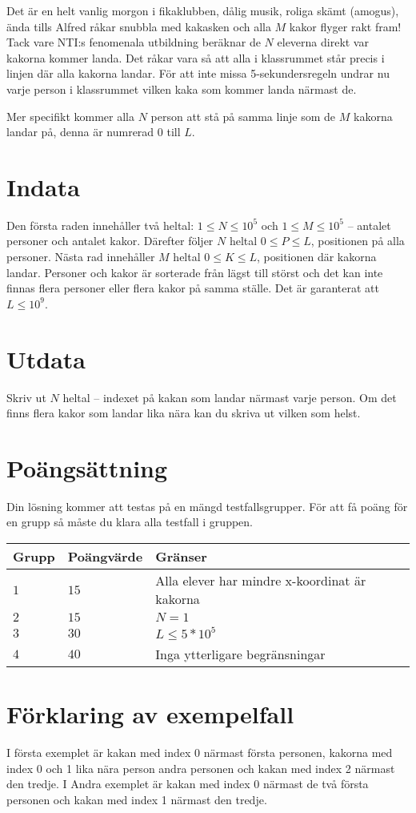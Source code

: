 Det är en helt vanlig morgon i fikaklubben, dålig musik, roliga skämt (amogus), ända tills Alfred råkar snubbla med kakasken och alla $M$ kakor flyger rakt fram!
Tack vare NTI:s fenomenala utbildning beräknar de $N$ eleverna direkt var kakorna kommer landa. Det råkar vara så att alla i klassrummet står precis i linjen där alla kakorna landar.
För att inte missa 5-sekundersregeln undrar nu varje person i klassrummet vilken kaka som kommer landa närmast de. 

Mer specifikt kommer alla $N$ person att stå på samma linje som de $M$ kakorna landar på, denna är numrerad 0 till $L$.


\section*{Indata}
Den första raden innehåller två heltal: $1\leq N \leq 10^5$ och $1 \leq M \leq 10^5$ -- antalet personer och antalet kakor. 
Därefter följer $N$ heltal $0 \leq P \leq L$, positionen på alla personer.
Nästa rad innehåller $M$ heltal $0 \leq K \leq L$, positionen där kakorna landar.
Personer och kakor är sorterade från lägst till störst och det kan inte finnas flera personer eller flera kakor på samma ställe.
Det är garanterat att $L \leq 10^9$.

\section*{Utdata}
Skriv ut $N$ heltal -- indexet på kakan som landar närmast varje person. Om det finns flera kakor som landar lika nära kan du skriva ut vilken som helst.

\section*{Poängsättning}
Din lösning kommer att testas på en mängd testfallsgrupper.
För att få poäng för en grupp så måste du klara alla testfall i gruppen.

\noindent
\begin{tabular}{| l | l | p{12cm} |}
  \hline
  Grupp & Poängvärde & Gränser \\ \hline
  $1$   & $15$       & Alla elever har mindre x-koordinat är kakorna \\ \hline
  $2$   & $15$       & $N=1$ \\ \hline
  $3$   & $30$       & $L \leq 5*10^5$ \\ \hline
  $4$   & $40$       & Inga ytterligare begränsningar  \\ \hline
\end{tabular}

\section*{Förklaring av exempelfall}
I första exemplet är kakan med index 0 närmast första personen, kakorna med index 0 och 1 lika nära person andra personen och kakan med index 2 närmast den tredje.
I Andra exemplet är kakan med index 0 närmast de två första personen och kakan med index 1 närmast den tredje.